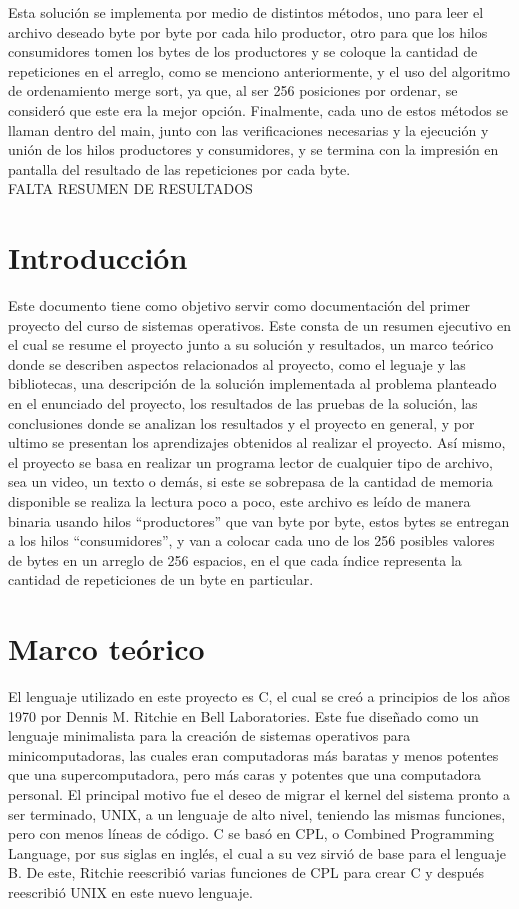 \documentclass[10pt, article, natbib]{IEEEtran}
\begin{document}
Esta solución se implementa por medio de distintos métodos, uno para leer el archivo deseado byte por byte por cada hilo productor, otro para que los hilos consumidores tomen los bytes de los productores y se coloque la cantidad de repeticiones en el arreglo, como se menciono anteriormente, y el uso del algoritmo de ordenamiento merge sort, ya que, al ser 256 posiciones por ordenar, se consideró que este era la mejor opción. Finalmente, cada uno de estos métodos se llaman dentro del main, junto con las verificaciones necesarias y la ejecución y unión de los hilos productores y consumidores, y se termina con la impresión en pantalla del resultado de las repeticiones por cada byte.\\

FALTA RESUMEN DE RESULTADOS

\newpage
\twocolumn
\section{Introducción}
Este documento tiene como objetivo servir como documentación del primer proyecto del curso de sistemas operativos. Este consta de un resumen ejecutivo en el cual se resume el proyecto junto a su solución y resultados, un marco teórico donde se describen aspectos relacionados al proyecto, como el leguaje y las bibliotecas, una descripción de la solución implementada al problema planteado en el enunciado del proyecto, los resultados de las pruebas de la solución, las conclusiones donde se analizan los resultados y el proyecto en general, y por ultimo se presentan los aprendizajes obtenidos al realizar el proyecto. Así mismo, el proyecto se basa en realizar un programa lector de cualquier tipo de archivo, sea un video, un texto o demás, si este se sobrepasa de la cantidad de memoria disponible se realiza la lectura poco a poco, este archivo es leído de manera binaria usando hilos “productores” que van byte por byte, estos bytes se entregan a los hilos “consumidores”, y van a colocar cada uno de los 256 posibles valores de bytes en un arreglo de 256 espacios, en el que cada índice representa la cantidad de repeticiones de un byte en particular.

\section{Marco teórico}
El lenguaje utilizado en este proyecto es C, el cual se creó a principios de los años 1970 por Dennis M. Ritchie en Bell Laboratories. Este fue diseñado como un lenguaje minimalista para la creación de sistemas operativos para minicomputadoras, las cuales eran computadoras más baratas y menos potentes que una supercomputadora, pero más caras y potentes que una computadora personal. El principal motivo fue el deseo de migrar el kernel del sistema pronto a ser terminado, UNIX, a un lenguaje de alto nivel, teniendo las mismas funciones, pero con menos líneas de código. C se basó en CPL, o Combined Programming Language, por sus siglas en inglés, el cual a su vez sirvió de base para el lenguaje B. De este, Ritchie reescribió varias funciones de CPL para crear C y después reescribió UNIX en este nuevo lenguaje.\cite{encyclopdiabritannica_2022_c} \cite{munoz_after}\\
\end{document}
